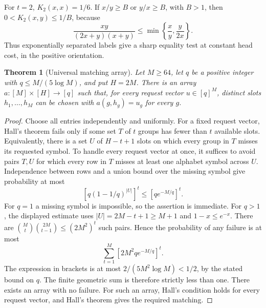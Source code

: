 \documentclass[11pt]{article}
\newtheorem{theorem}{Theorem}
\begin{document}
For $t=2$, $K_2(x,x)=1/6$. If $x/y\geq B$ or $y/x\geq B$, with
$B>1$, then $0<K_2(x,y)\leq1/B$, because
\[
 \frac{xy}{(2x+y)(x+y)}
 \leq \min\left\{\frac{x}{y},\frac{y}{2x}\right\}.
\]
Thus exponentially separated labels give a sharp equality test at
constant head cost, in the positive orientation.

\begin{theorem}[Universal matching array]
Let $M\geq64$, let $q$ be a positive integer with
$q\leq M/(5\log M)$, and put $H=2M$. There is an array
$a:[M]\times[H]\longrightarrow[q]$ such that, for every request vector
$u\in[q]^M$, distinct slots $h_1,\ldots,h_M$ can be chosen with
$a(g,h_g)=u_g$ for every $g$.
\end{theorem}
\begin{proof}
Choose all entries independently and uniformly. For a fixed request
vector, Hall's theorem fails only if some set $T$ of $t$ groups has
fewer than $t$ available slots. Equivalently, there is a set $U$ of
$H-t+1$ slots on which every group in $T$ misses its requested symbol.
To handle every request vector at once, it suffices to avoid pairs
$T,U$ for which every row in $T$ misses at least one alphabet symbol
across $U$. Independence between rows and a union bound over the
missing symbol give probability at most
\[
 \left[q(1-1/q)^{|U|}\right]^t
 \leq \left[q e^{-M/q}\right]^t.
\]
For $q=1$ a missing symbol is impossible, so the assertion is immediate.
For $q>1$, the displayed estimate uses
$|U|=2M-t+1\geq M+1$ and $1-x\leq e^{-x}$.
There are
$\binom Mt\binom{2M}{t-1}\leq(2M^2)^t$
such pairs. Hence the probability of any failure is at most
\[
 \sum_{t=1}^M [2M^2q e^{-M/q}]^t.
\]
The expression in brackets is at most
$2/(5M^2\log M)<1/2$, by the stated bound on $q$.
The finite geometric sum is therefore strictly less than one.
There exists an array with no failure. For such an array, Hall's
condition holds for every request vector, and Hall's theorem gives
the required matching.
\end{proof}
\end{document}
